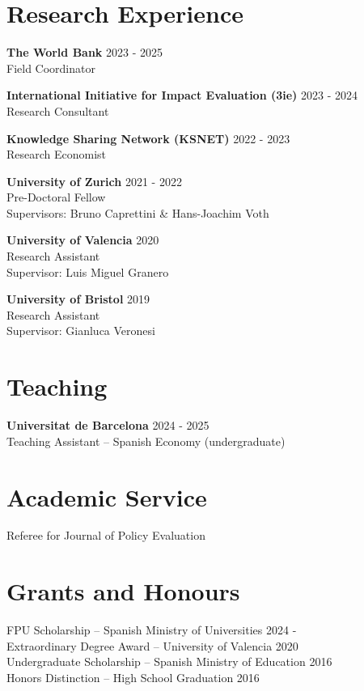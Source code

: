 \documentclass[11pt,a4paper]{article}
\begin{document}
\section*{Research Experience}

\textbf{The World Bank} \hfill 2023 - 2025\\
Field Coordinator

\textbf{International Initiative for Impact Evaluation (3ie)} \hfill 2023 - 2024\\
Research Consultant

\textbf{Knowledge Sharing Network (KSNET)} \hfill 2022 - 2023\\
Research Economist

\textbf{University of Zurich} \hfill 2021 - 2022\\
Pre-Doctoral Fellow\\
Supervisors: Bruno Caprettini \& Hans-Joachim Voth

\textbf{University of Valencia} \hfill 2020\\
Research Assistant\\
Supervisor: Luis Miguel Granero

\textbf{University of Bristol} \hfill 2019\\
Research Assistant\\
Supervisor: Gianluca Veronesi

\section*{Teaching}

\textbf{Universitat de Barcelona} \hfill 2024 - 2025\\
Teaching Assistant -- Spanish Economy (undergraduate)

\section*{Academic Service}
Referee for Journal of Policy Evaluation

\section*{Grants and Honours}

FPU Scholarship -- Spanish Ministry of Universities \hfill 2024 -\\
Extraordinary Degree Award -- University of Valencia \hfill 2020\\
Undergraduate Scholarship -- Spanish Ministry of Education \hfill 2016\\
Honors Distinction -- High School Graduation \hfill 2016
\end{document}
